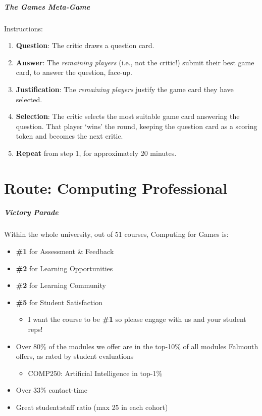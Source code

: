 \begin{frame}
	\frametitle{The Games Meta-Game}
	
	Instructions:
	
	\begin{enumerate}
		\item 	\textbf{Question}: The critic draws a question card. 
		\item 	\textbf{Answer}: The \textit{remaining players} (i.e., not the critic!) submit their best game card, to answer the question, face-up.
		\item 	\textbf{Justification}: The \textit{remaining players} justify the game card they have selected.
		\item 	\textbf{Selection}: The critic selects the most suitable game card answering the question. That player `wins' the round, keeping the question card as a scoring token
			and becomes the next critic.	
		\item 	\textbf{Repeat} from step 1, for approximately 20 minutes.	
	\end{enumerate}
\end{frame}
   
\part{Route: Computing Professional}
\frame{\partpage}

\begin{frame}
	\frametitle{Victory Parade}
	
	Within the whole university, out of 51 courses, Computing for Games is: \pause
	
	\begin{itemize}
		\item \textbf{\#1} for Assessment \& Feedback \pause
		\item \textbf{\#2} for Learning Opportunities \pause
		\item \textbf{\#2} for Learning Community \pause
		\item \textbf{\#5} for Student Satisfaction \pause
		\begin{itemize}
			\item I want the course to be \textbf{\#1} so please engage with us and your student reps! \pause
		\end{itemize}
		\item Over 80\% of the modules we offer are in the top-10\% of all modules Falmouth offers, as rated by student evaluations  \pause
		\begin{itemize}
			\item COMP250: Artificial Intelligence in top-1\% \pause
		\end{itemize}	
		\item Over 33\% contact-time \pause
		\item Great student:staff ratio (max 25 in each cohort) \pause
	\end{itemize}
\end{frame}

